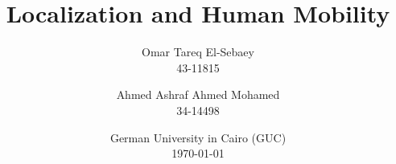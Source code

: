 \documentclass[11pt, a4paper, english]{report}
\title{Localization and Human Mobility}
\author{Omar Tareq El-Sebaey \\ 43-11815 \and Ahmed Ashraf Ahmed Mohamed \\ 34-14498}
\date{German University in Cairo (GUC) \\ \today}
\begin{document}
    \begin{titlepage}
        \maketitle
        \begin{abstract}
            \textcolor{red}{\blindtext[1]}
        \end{abstract}
        \tableofcontents
    \end{titlepage}
    
    
    
    
    
    
\end{document}
